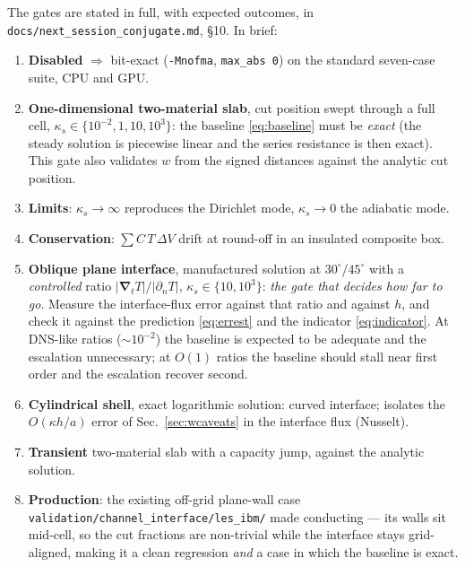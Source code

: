 \documentclass[11pt,a4paper]{article}
\newcommand{\grad}{\boldsymbol{\nabla}}
\newcommand{\code}[1]{\texttt{#1}}
\begin{document}
The gates are stated in full, with expected outcomes, in
\code{docs/next\_session\_conjugate.md}, \S10. In brief:
\begin{enumerate}
\item \textbf{Disabled} $\Rightarrow$ bit-exact (\code{-Mnofma},
      \code{max\_abs 0}) on the standard seven-case suite, CPU and GPU.
\item \textbf{One-dimensional two-material slab}, cut position swept through a
      full cell, $\kappa_s\in\{10^{-2},1,10,10^{3}\}$: the baseline
      \eqref{eq:baseline} must be \emph{exact} (the steady solution is piecewise
      linear and the series resistance is then exact). This gate also validates
      $w$ from the signed distances against the analytic cut position.
\item \textbf{Limits}: $\kappa_s\to\infty$ reproduces the Dirichlet mode,
      $\kappa_s\to0$ the adiabatic mode.
\item \textbf{Conservation}: $\sum C\,T\,\Delta V$ drift at round-off in an
      insulated composite box.
\item \textbf{Oblique plane interface}, manufactured solution at
      $30^\circ$/$45^\circ$ with a \emph{controlled} ratio
      $|\grad_tT|/|\partial_nT|$, $\kappa_s\in\{10,10^{3}\}$: \emph{the gate that
      decides how far to go}. Measure the interface-flux error against that
      ratio and against $h$, and check it against the prediction
      \eqref{eq:errest} and the indicator \eqref{eq:indicator}. At DNS-like
      ratios ($\sim10^{-2}$) the baseline is expected to be adequate and the
      escalation unnecessary; at $O(1)$ ratios the baseline should stall near
      first order and the escalation recover second.
\item \textbf{Cylindrical shell}, exact logarithmic solution: curved interface;
      isolates the $O(\kappa h/a)$ error of Sec.~\ref{sec:wcaveats} in the
      interface flux (Nusselt).
\item \textbf{Transient} two-material slab with a capacity jump, against the
      analytic solution.
\item \textbf{Production}: the existing off-grid plane-wall case
      \code{validation/channel\_interface/les\_ibm/} made conducting --- its
      walls sit mid-cell, so the cut fractions are non-trivial while the
      interface stays grid-aligned, making it a clean regression \emph{and} a
      case in which the baseline is exact.
\end{enumerate}
\end{document}
